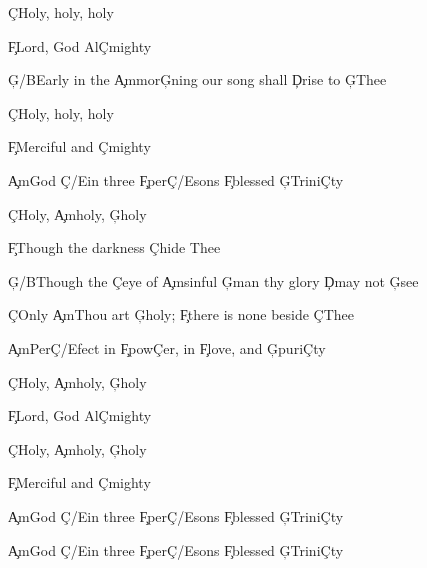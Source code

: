 \documentclass[9pt]{extarticle}
\begin{document}
\bsong

\bv
\c{C}Holy, holy, holy

\c{F}Lord, God Al\c{C}mighty

\c{G/B}Early in the \c{Am}mor\c{G}ning our song shall \c{D}rise to \c{G}Thee

\c{C}Holy, holy, holy

\c{F}Merciful and \c{C}mighty

\c{Am}God \c{C/E}in three \c{F}per\c{C/E}sons \c{F}blessed \c{G}Trini\c{C}ty
\ev

\bv
\c{C}Holy, \c{Am}holy, \c{G}holy

\c{F}Though the darkness \c{C}hide Thee

\c{G/B}Though the \c{C}eye of \c{Am}sinful \c{G}man thy glory \c{D}may not \c{G}see

\c{C}Only \c{Am}Thou art \c{G}holy; \c{F}there is none beside \c{C}Thee

\c{Am}Per\c{C/E}fect in \c{F}pow\c{C}er, in \c{F}love, and \c{G}puri\c{C}ty
\ev

\bv
\c{C}Holy, \c{Am}holy, \c{G}holy

\c{F}Lord, God Al\c{C}mighty


\c{C}Holy, \c{Am}holy, \c{G}holy

\c{F}Merciful and \c{C}mighty

\c{Am}God \c{C/E}in three \c{F}per\c{C/E}sons \c{F}blessed \c{G}Trini\c{C}ty
\ev

\bo
\c{Am}God \c{C/E}in three \c{F}per\c{C/E}sons \c{F}blessed \c{G}Trini\c{C}ty
\eo

\esong
\end{document}
